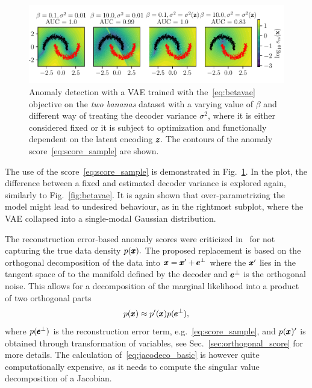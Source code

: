 \begin{figure}
\begin{centering}
\includegraphics[scale=0.98]{data/chapter_survey/vae_examples.pdf}
\end{centering}
\caption{Anomaly detection with a VAE trained with the~\eqref{eq:betavae} objective on the \textit{two bananas} dataset with a varying value of $\beta$ and different way of treating the decoder variance $\sigma^2$, where it is either considered fixed or it is subject to optimization and functionally dependent on the latent encoding $\pmb{{z}}$. The contours of the anomaly score~\eqref{eq:score_sample} are shown.}
\label{fig:vae_examples}
\end{figure}

The use of the score~\eqref{eq:score_sample} is demonstrated in Fig.~\ref{fig:vae_examples}. In the plot, the difference between a fixed and estimated decoder variance is explored again, similarly to Fig.~\ref{fig:betavae}. It is again shown that over-parametrizing the model might lead to undesired behaviour, as in the rightmost subplot, where the VAE collapsed into a single-modal Gaussian distribution.

The reconstruction error-based anomaly scores were criticized in~\cite{pidhorskyi2018generative} for not capturing the true data density $p(\pmb{{x}}).$ The proposed replacement is based on the orthogonal decomposition of the data into $\pmb{{x}}= \pmb{{x}}' + \pmb{{e}}^\bot$ where the $\pmb{{x}}'$ lies in the tangent space of to the manifold defined by the decoder and $\pmb{{e}}^\bot$ is the orthogonal noise. This allows for a decomposition of the marginal likelihood into a product of two orthogonal parts
\begin{equation} \label{eq:jacodeco_basic}
    p(\pmb{{x}}) \approx p'(\pmb{{x}}) p(\pmb{{e}}^{\bot}),
\end{equation}
where $p(\pmb{{e}}^{\bot})$ is the reconstruction error term, e.g.~\eqref{eq:score_sample}, and $p(\pmb{{x}})'$ is obtained through transformation of variables, see Sec.~\ref{sec:orthogonal_score} for more details. The calculation of~\eqref{eq:jacodeco_basic} is however quite computationally expensive, as it needs to compute the singular value decomposition of a Jacobian.

